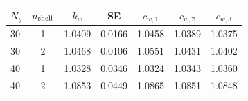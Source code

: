 \begin{ruledtabular}
\begin{tabular}{lcccccc}
\toprule
$N_y$ & $n_{\rm shell}$ & $k_w$ & SE & $c_{w,1}$ & $c_{w,2}$ & $c_{w,3}$ \\
\midrule
30 & 1 & 1.0409 & 0.0166 & 1.0458 & 1.0389 & 1.0375 \\
30 & 2 & 1.0468 & 0.0106 & 1.0551 & 1.0431 & 1.0402 \\
40 & 1 & 1.0328 & 0.0346 & 1.0324 & 1.0343 & 1.0360 \\
40 & 2 & 1.0853 & 0.0449 & 1.0865 & 1.0851 & 1.0848 \\
\bottomrule
\end{tabular}
\end{ruledtabular}
